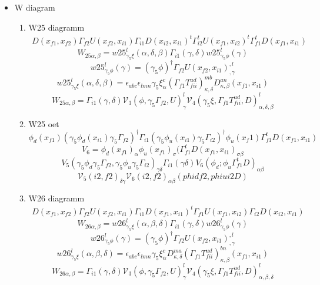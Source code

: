 \documentclass{article}[12pt]
\begin{document}
\begin{itemize}
\begin{enumerate}
\end{enumerate}
\item W diagram
\begin{enumerate}
\item W25 diagramm
\begin{eqnarray}
D(x_{f1},x_{f2})\Gamma_{f2}U(x_{f2},x_{i1})\Gamma_{i1}D(x_{i2},x_{i1})^t\Gamma_{i2}^tU(x_{f1},x_{i2})^t\Gamma_{f1}^tD(x_{f1},x_{i1})
\end{eqnarray}
$$
W_{25\alpha,\beta}=w25_{\gamma_5\xi}^{l}\left(\alpha,\delta,\beta\right)\Gamma_{i1}\left(\gamma,\delta\right)w25_{\gamma_5\phi}^{l}\left(\gamma\right)
$$
$$
w25_{\gamma_5\phi}^{l}\left(\gamma\right)=(\gamma_5\phi)^{\dagger}\Gamma_{f2}U\left(x_{f2},x_{i1}\right)^{,l}_{,\gamma}
$$
$$
w25_{\gamma_5\xi}^{l}\left(\alpha,\delta,\beta\right)=\epsilon_{abc}\epsilon_{lmn}\gamma_5\xi^{c}_{\alpha}\left(\Gamma_{f1}T_{fii}^{ud}\right)^{mb}_{\kappa,\delta}D^{an}_{\kappa,\beta}\left(x_{f1},x_{i1}\right)
$$
$$
W_{25\alpha,\beta}=\Gamma_{i1}\left(\gamma,\delta\right){\mathcal V}_{3}\left(\phi,\gamma_5\Gamma_{f2},U\right)^{l}_{\gamma}{\mathcal V}_{4}\left(\gamma_5\xi,\Gamma_{f1}T_{fii}^{ud},D\right)^{l}_{\alpha,\delta,\beta}
$$
\item W25 oet
$$
\phi_d(x_{f1})(\gamma_5\phi_d(x_{i1})\gamma_5\Gamma_{f2})^\dagger\Gamma_{i1}
(\gamma_5\phi_u(x_{i1})\gamma_5\Gamma_{i2})^\dagger\phi_u(x_f1)\Gamma_{f1}^tD(x_{f1},x_{i1})
$$
$$
V_6=\phi_d(x_{f1})_{\alpha}\phi_u(x_{f1})_{\sigma}(\Gamma_{f1}^tD(x_{f1},x_{i1})_{\sigma\beta}
$$
$$
V_5(\gamma_5\phi_d\gamma_5\Gamma_{f2},\gamma_5\phi_u\gamma_5\Gamma_{i2})_{\gamma\delta}\Gamma_{i1}(\gamma\delta)V_6(\phi_d;\phi_u\Gamma_{f1}^tD)_{\alpha\beta}
$$
$$
{\mathcal V}_5(i2,f2)_{\delta\gamma}{\mathcal V}_6(i2,f2)_{\alpha\beta}(phidf2,phiui2D)
$$
\item W26 diagramm
\begin{eqnarray}
D(x_{f1},x_{f2})\Gamma_{f2}U(x_{f2},x_{i1})\Gamma_{i1}D(x_{f1},x_{i1})^t\Gamma_{f1}U(x_{f1},x_{i2})\Gamma_{i2}D(x_{i2},x_{i1})
\end{eqnarray}
$$
W_{26\alpha,\beta}=w26_{\gamma_5\xi}^{l}\left(\alpha,\beta,\delta\right)\Gamma_{i1}\left(\gamma,\delta\right)w26_{\gamma_5\phi}^{l}\left(\gamma\right)
$$
$$
w26_{\gamma_5\phi}^{l}\left(\gamma\right)=(\gamma_5\phi)^{\dagger}\Gamma_{f2}U\left(x_{f2},x_{i1}\right)^{,l}_{,\gamma}
$$
$$
w26_{\gamma_5\xi}^{l}\left(\alpha,\beta,\delta\right)=\epsilon_{abc}\epsilon_{lmn}\gamma_5\xi^{c}_{\alpha}D^{ma}_{\kappa,\delta}\left(\Gamma_{f1}T_{fii}^{ud}\right)^{bn}_{\kappa,\beta}\left(x_{f1},x_{i1}\right)
$$
$$
W_{26\alpha,\beta}=\Gamma_{i1}\left(\gamma,\delta\right){\mathcal V}_{3}\left(\phi,\gamma_5\Gamma_{f2},U\right)^{l}_{\gamma}{\mathcal V}_{4}\left(\gamma_5\xi,\Gamma_{f1}T_{fii}^{ud},D\right)^{l}_{\alpha,\beta,\delta}
$$


\end{enumerate}
\end{itemize}
\end{document}

